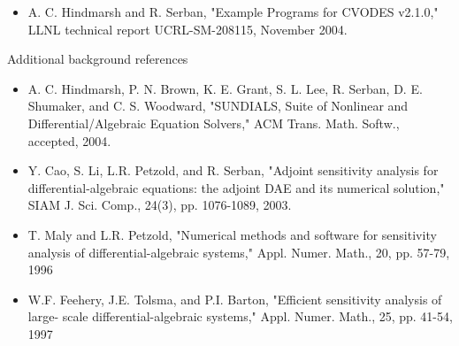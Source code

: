 \documentclass[12pt]{letter}
\begin{document}
\begin{letter}
\begin{enumerate}
\begin{itemize}
\item A. C. Hindmarsh and R. Serban, "Example Programs for CVODES v2.1.0," 
    LLNL technical report UCRL-SM-208115, November 2004.
\end{itemize}
Additional background references
\begin{itemize}
\item A. C. Hindmarsh, P. N. Brown, K. E. Grant, S. L. Lee, R. Serban, 
    D. E. Shumaker, and C. S. Woodward, "SUNDIALS, Suite of Nonlinear and 
    Differential/Algebraic Equation Solvers," ACM Trans. Math. Softw., 
    accepted, 2004.

\item Y. Cao, S. Li, L.R. Petzold, and R. Serban, "Adjoint sensitivity analysis for 
    differential-algebraic equations: the adjoint DAE and its numerical solution," 
    SIAM J. Sci. Comp., 24(3), pp. 1076-1089, 2003.

\item T. Maly and L.R. Petzold, "Numerical methods and software for sensitivity analysis 
    of differential-algebraic systems," Appl. Numer. Math., 20, pp. 57-79, 1996

\item W.F. Feehery, J.E. Tolsma, and P.I. Barton, "Efficient sensitivity analysis of large-
   scale differential-algebraic systems," Appl. Numer. Math., 25, pp. 41-54, 1997
\end{itemize}
\end{enumerate}

\end{letter}
\end{document}
